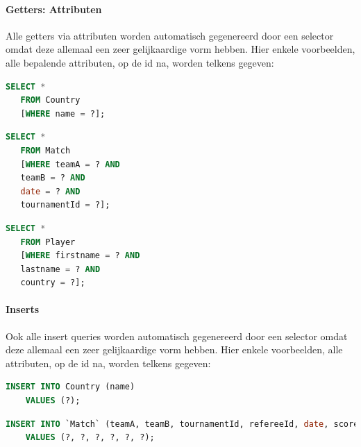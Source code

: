 \documentclass[11pt]{article}
\begin{document}
\paragraph{Getters: Attributen}

  Alle getters via attributen worden automatisch gegenereerd door een selector omdat deze allemaal een zeer gelijkaardige vorm hebben.
  Hier enkele voorbeelden, alle bepalende attributen, op de id na, worden telkens gegeven:

  \begin{framed}
  \begin{lstlisting}[language=sql]
  SELECT *
   FROM Country
   [WHERE name = ?];
  \end{lstlisting}
  \end{framed}

  \begin{framed}
  \begin{lstlisting}[language=sql]
  SELECT *
   FROM Match
   [WHERE teamA = ? AND
   teamB = ? AND
   date = ? AND
   tournamentId = ?];
  \end{lstlisting}
  \end{framed}

  \begin{framed}
  \begin{lstlisting}[language=sql]
  SELECT *
   FROM Player
   [WHERE firstname = ? AND
   lastname = ? AND
   country = ?];
  \end{lstlisting}
  \end{framed}

\paragraph{Inserts}

  Ook alle insert queries worden automatisch gegenereerd door een selector omdat deze allemaal een zeer gelijkaardige vorm hebben.
  Hier enkele voorbeelden, alle attributen, op de id na, worden telkens gegeven:

  \begin{framed}
  \begin{lstlisting}[language=sql]
    INSERT INTO Country (name)
    VALUES (?);
  \end{lstlisting}
  \end{framed}

  \begin{framed}
  \begin{lstlisting}[language=sql]
    INSERT INTO `Match` (teamA, teamB, tournamentId, refereeId, date, scoreId)
    VALUES (?, ?, ?, ?, ?, ?);
  \end{lstlisting}
  \end{framed}
\end{document}
